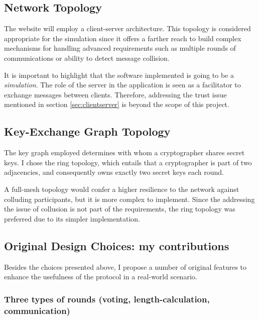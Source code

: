 \subsection{Network Topology}
The website will employ a client-server architecture. This topology is considered appropriate for the simulation since it offers a farther reach to build complex mechanisms for handling advanced requirements such as multiple rounds of communications or ability to detect message collision.

It is important to highlight that the software implemented is going to be a \emph{simulation}. The role of the server in the application is seen as a facilitator to exchange messages between clients. Therefore, addressing the trust issue mentioned in section \ref{sec:clientserver} is beyond the scope of this project.


\subsection{Key-Exchange Graph Topology}
The key graph employed determines with whom a cryptographer shares secret keys. I chose the ring topology, which entails that a cryptographer is part of two adjacencies, and consequently owns exactly two secret keys each round. 

A full-mesh topology would confer a higher resilience to the network against colluding participants, but it is more complex to implement. Since the addressing the issue of collusion is not part of the requirements, the ring topology was preferred due to its simpler implementation.


\subsection{Original Design Choices: my contributions}
Besides the choices presented above, I propose a number of original features to enhance the usefulness of the protocol in a real-world scenario.







\subsubsection{Three types of rounds (voting, length-calculation, communication)} \label{sec:threeRoundTypes}

